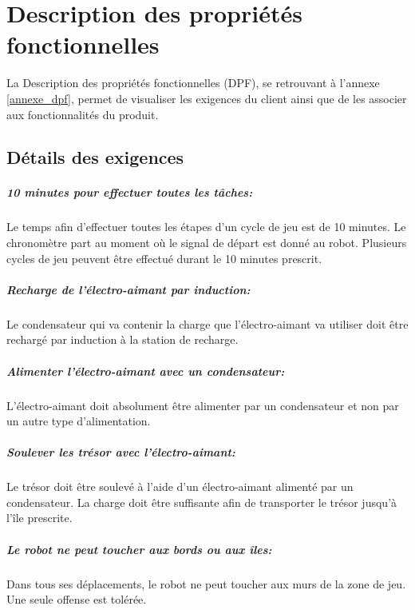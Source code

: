 \chapter{Description des propriétés fonctionnelles}
La Description des propriétés fonctionnelles (DPF), se retrouvant à l'annexe \ref{annexe_dpf}, permet de visualiser les exigences du client ainsi que de les associer aux fonctionnalités du produit.

\section{Détails des exigences}

\paragraph{10 minutes pour effectuer toutes les tâches:}
Le temps afin d'effectuer toutes les étapes d'un cycle de jeu est de 10 minutes. Le chronomètre part au moment où le signal de départ est donné au robot.
Plusieurs cycles de jeu peuvent être effectué durant le 10 minutes prescrit.

\paragraph{Recharge de l'électro-aimant par induction:}
Le condensateur qui va contenir la charge que l'électro-aimant va utiliser doit être rechargé par induction à la station de recharge.

\paragraph{Alimenter l'électro-aimant avec un condensateur:}
L'électro-aimant doit absolument être alimenter par un condensateur et non par un autre type d'alimentation.

\paragraph{Soulever les trésor avec l'électro-aimant:}
Le trésor doit être soulevé à l'aide d'un électro-aimant alimenté par un condensateur. La charge doit être suffisante afin de transporter le trésor jusqu'à l'île prescrite.

\paragraph{Le robot ne peut toucher aux bords ou aux îles:}
Dans tous ses déplacements, le robot ne peut toucher aux murs de la zone de jeu. Une seule offense est tolérée.

